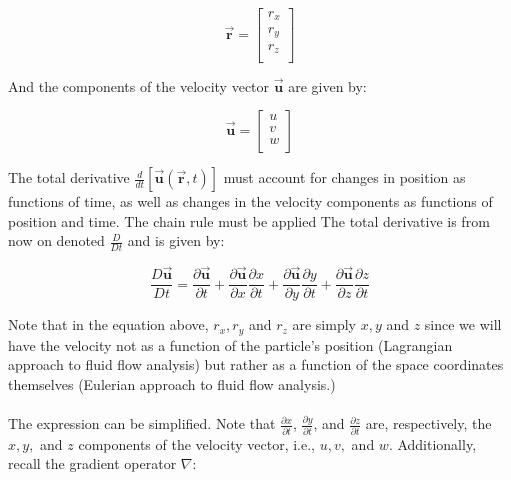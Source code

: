 \documentclass[11pt]{article}
\begin{document}
\begin{equation*}
    \vec{\bm{r}} = \begin{bmatrix}
                    r_x \\
                    r_y \\
                    r_z \\     
                    \end{bmatrix}
\end{equation*}

\noindent
And the components of the velocity vector $\vec{\bm{u}}$ are given by:

\begin{equation*}
    \vec{\bm{u}} = \begin{bmatrix}
                    u \\
                    v \\
                    w \\     
                    \end{bmatrix}
\end{equation*}

\noindent
The total derivative $\frac{d}{dt}[\vec{\bm{u}}(\vec{\bm{r}}, t)]$ must account for changes in position as functions of time, as well as changes in the velocity components as functions of position and time. The chain rule must be applied The total derivative is from now on denoted $\frac{D}{Dt}$ and is given by:

\begin{equation*}
    \frac{D\vec{\bm{u}}}{Dt} = \frac{\partial\vec{\bm{u}}}{\partial t} + \frac{\partial\vec{\bm{u}}}{\partial x}\frac{\partial x}{\partial t} + \frac{\partial\vec{\bm{u}}}{\partial y}\frac{\partial y}{\partial t} + \frac{\partial\vec{\bm{u}}}{\partial z}\frac{\partial z}{\partial t}
\end{equation*}

\noindent
Note that in the equation above, $r_x, r_y$ and $r_z$ are simply $x, y$ and $z$ since we will have the velocity not as a function of the particle's position (Lagrangian approach to fluid flow analysis) but rather as a function of the space coordinates themselves (Eulerian approach to fluid flow analysis.) \\ \\
\noindent
The expression can be simplified. Note that $\frac{\partial x}{\partial t}$, $\frac{\partial y}{\partial t}$, and $\frac{\partial z}{\partial t}$ are, respectively, the $x, y, $ and $z$ components of the velocity vector, i.e., $u, v,$ and $w$. Additionally, recall the gradient operator $\nabla$:
\end{document}
